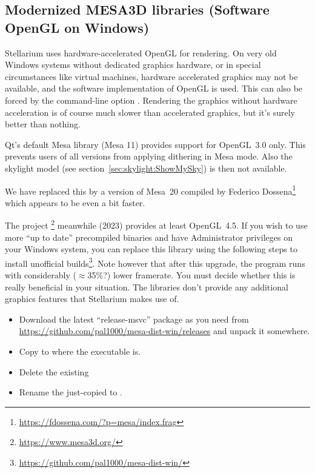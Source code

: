 \subsection{Modernized MESA3D libraries (Software OpenGL on Windows)}
\label{sec:ExtraData:Mesa}

Stellarium uses hardware-accelerated OpenGL for rendering. On very old Windows systems without dedicated graphics hardware, 
or in special circumstances like virtual machines, hardware accelerated graphics may not be available, 
and the  software implementation of OpenGL is used. This can also be forced by the command-line option . 
Rendering the graphics without hardware acceleration is of course much slower than accelerated graphics, but it's surely better than nothing.

Qt's default Mesa library (Mesa 11) provides support for OpenGL~3.0 only. This prevents users of all versions from applying dithering in Mesa mode. 
Also the  skylight model (see section~\ref{sec:skylight:ShowMySky}) is then not available.

We have replaced this by a version of Mesa~20 compiled by Federico Dossena\footnote{\url{https://fdossena.com/?p=mesa/index.frag}} which appears to be even a bit faster.

The  project \footnote{\url{https://www.mesa3d.org/}} meanwhile (2023) provides at least OpenGL~4.5. 
If you wish to use more ``up to date'' precompiled binaries and have Administrator privileges on your Windows system, 
you can replace this library using the following steps to install unofficial builds\footnote{\url{https://github.com/pal1000/mesa-dist-win/}}. 
Note however that after this upgrade, the program runs with considerably ($\approx$35\%?) lower framerate. 
You must decide whether this is really beneficial in your situation. The libraries don't provide any additional graphics features that Stellarium makes use of.

\begin{itemize}
\item Download the latest ``release-msvc'' package as you need from \url{https://github.com/pal1000/mesa-dist-win/releases} and unpack it somewhere.
\item Copy  to where the executable  is.
\item Delete the existing 
\item Rename the just-copied  to .
\end{itemize}

